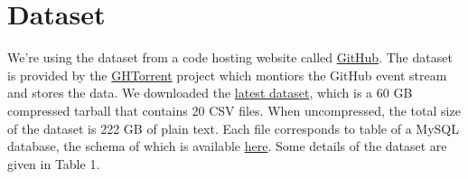\newpage
\section{Dataset}

We're using the dataset from a code hosting website called \href{http://github.com/}{GitHub}.
The dataset is provided by the \href{http://ghtorrent.org/}{GHTorrent} project which montiors the GitHub event stream and stores the data.
We downloaded the \href{http://ghtorrent-downloads.ewi.tudelft.nl/mysql/mysql-2017-09-01.tar.gz}{latest dataset}, which is a 60 GB compressed tarball that contains 20 CSV files. When uncompressed, the total size of the dataset is 222 GB of plain text. Each file corresponds to table of a MySQL database, the schema of which is available \href{http://ghtorrent.org/files/schema.pdf}{here}. Some details of the dataset are given in Table 1.

\par

